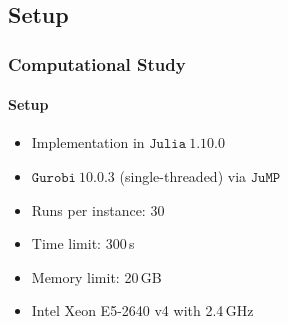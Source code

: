 \documentclass[aspectratio=1610]{beamer}
\begin{document}
\subsection{Setup}
\begin{frame}
  \frametitle{Computational Study}
  \framesubtitle{Setup}
  
\begin{itemize}
	\item Implementation in $\mathtt{Julia\ 1.10.0}$
	\item $\mathtt{Gurobi\ 10.0.3}$ (single-threaded) via $\mathtt{JuMP}$
	\item Runs per instance: 30 
	\item Time limit: 300\,s
	\item Memory limit: 20\,GB
	\item Intel Xeon E5-2640 v4 with 2.4\,GHz
\end{itemize}

\end{frame}

\end{document}
